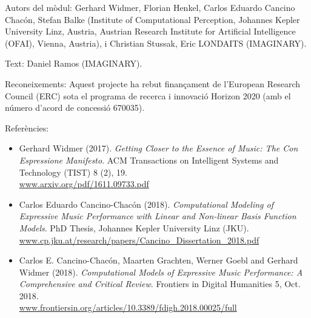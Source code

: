 \begin{sectcredits}

\item[Autors del mòdul:] Gerhard Widmer, Florian Henkel, Carlos Eduardo Cancino Chacón, Stefan Balke (Institute of Computational Perception, Johannes Kepler University Linz, Austria, Austrian Research Institute for Artificial Intelligence (OFAI), Vienna, Austria), i Christian Stussak, Eric LONDAITS (IMAGINARY).

\item[Text:] Daniel Ramos (IMAGINARY).

\item[Reconeixements:] Aquest projecte ha rebut finançament de l'European Research Council (ERC) sota el programa de recerca i innovació Horizon 2020 (amb el número d'acord de concessió 670035).

\item[Referències:] \strut
\noindent \begin{itemize}[leftmargin=*]
\item Gerhard Widmer (2017). \emph{Getting Closer to the Essence of Music: The Con Espressione Manifesto}. ACM Transactions on Intelligent Systems and Technology (TIST) 8 (2), 19. \\
\url{www.arxiv.org/pdf/1611.09733.pdf}

\item Carlos Eduardo Cancino-Chacón (2018). \emph{Computational Modeling of Expressive Music Performance with Linear and Non-linear Basis Function Models}. PhD Thesis, Johannes Kepler University Linz (JKU).\\
\url{www.cp.jku.at/research/papers/Cancino_Dissertation_2018.pdf}

\item Carlos E. Cancino-Chacón, Maarten Grachten, Werner Goebl and Gerhard Widmer (2018). \emph{Computational Models of Expressive Music Performance: A Comprehensive and Critical Review}. Frontiers in Digital Humanities 5, Oct. 2018. \\
\url{www.frontiersin.org/articles/10.3389/fdigh.2018.00025/full}
\end{itemize}
\end{sectcredits}
